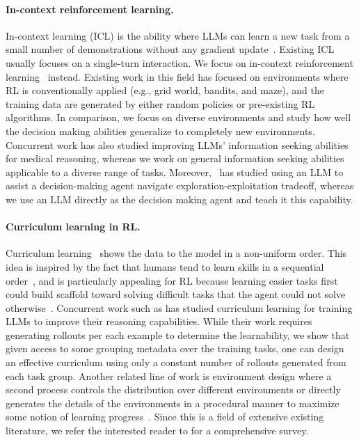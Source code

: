 \paragraph{In-context reinforcement learning.} In-context learning (ICL) is the ability where LLMs can learn a new task from a small number of demonstrations without any gradient update~\citep{brown2020language}. Existing ICL usually focuses on a single-turn interaction. We focus on in-context reinforcement learning~\citep{laskin2022context, raparthy2023generalization, lee2024supervised, lin2024transformers} instead. Existing work in this field has focused on environments where RL is conventionally applied (e.g., grid world, bandits, and maze), and the training data are generated by either random policies or pre-existing RL algorithms. In comparison, we focus on diverse environments and study how well the decision making abilities generalize to completely new environments. Concurrent work has also studied improving LLMs' information seeking abilities~\citep{li2025aligningllmsaskgood} for medical reasoning, whereas we work on general information seeking abilities applicable to a diverse range of tasks. Moreover,~\citet{harris2025uselargelanguagemodel} has studied using an LLM to assist a decision-making agent navigate exploration-exploitation tradeoff, whereas we use an LLM directly as the decision making agent and teach it this capability.

\paragraph{Curriculum learning in RL.}
Curriculum learning~\citep{bengio2009curriculum} shows the data to the model in a non-uniform order. This idea is inspired by the fact that humans tend to learn skills in a sequential order~\citep{skinner1958reinforcement}, and is particularly appealing for RL because learning easier tasks first could build scaffold toward solving difficult tasks that the agent could not solve otherwise~\citep{andrychowicz2017hindsight, florensa2017reverse, fang2019curriculum, portelas2020teacher}. Concurrent work such as \citet{foster2025learningreasonfrontierlearnability} has studied curriculum learning for training LLMs to improve their reasoning capabilities. While their work requires generating rollouts per each example to determine the learnability, we show that given access to some grouping metadata over the training tasks, one can design an effective curriculum using only a constant number of rollouts generated from each task group.
Another related line of work is environment design where a second process controls the distribution over different environments or directly generates the details of the environments in a procedural manner to maximize some notion of learning progress~\citep{wang2019paired, dennis2020emergent, jiang2021prioritized, jiang2021replay, bruce2024genie}.
Since this is a field of extensive existing literature, we refer the interested reader to \citet{portelas2020automatic} for a comprehensive survey.

